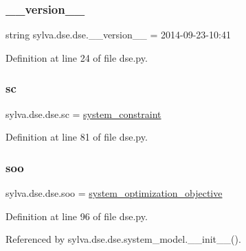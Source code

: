 \subsubsection{\texorpdfstring{\+\_\+\+\_\+version\+\_\+\+\_\+}{\_\_version\_\_}}
{\footnotesize\ttfamily string sylva.\+dse.\+dse.\+\_\+\+\_\+version\+\_\+\+\_\+ = \textquotesingle{}2014-\/09-\/23-\/10\+:41\textquotesingle{}\hspace{0.3cm}{\ttfamily [private]}}



Definition at line 24 of file dse.\+py.

\mbox{\label{namespacesylva_1_1dse_1_1dse_ac2d9fdcc3f7fd0bad1900fa0a813dff4}} 
\subsubsection{\texorpdfstring{sc}{sc}}
{\footnotesize\ttfamily sylva.\+dse.\+dse.\+sc = \hyperlink{classsylva_1_1dse_1_1dse_1_1system__constraint}{system\+\_\+constraint}}



Definition at line 81 of file dse.\+py.

\mbox{\label{namespacesylva_1_1dse_1_1dse_ab54fbae03bc2c432fecd4486e623af71}} 
\subsubsection{\texorpdfstring{soo}{soo}}
{\footnotesize\ttfamily sylva.\+dse.\+dse.\+soo = \hyperlink{classsylva_1_1dse_1_1dse_1_1system__optimization__objective}{system\+\_\+optimization\+\_\+objective}}



Definition at line 96 of file dse.\+py.



Referenced by sylva.\+dse.\+dse.\+system\+\_\+model.\+\_\+\+\_\+init\+\_\+\+\_\+().

